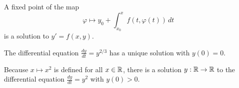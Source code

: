 \documentclass{homework}
\begin{document}
\begin{problem}
  A fixed point of the map
  \[
    \varphi \mapsto y_0 + \int_{x_0}^x f(t,\varphi(t)) \, dt
  \]
  is a solution to $y' = f(x,y)$.
\end{problem}

\begin{problem}
  The differential equation $\displaystyle\frac{dy}{dt} = y^{2/3}$ has a unique solution with $y(0) = 0$.
\end{problem}

\begin{problem}
  Because $x \mapsto x^2$ is defined for all $x \in \mathbb{R}$, there is a solution $y : \mathbb{R} \to \mathbb{R}$ to the differential equation $\displaystyle\frac{dy}{dt} = y^2$ with $y(0) > 0$.
\end{problem}
\end{document}
